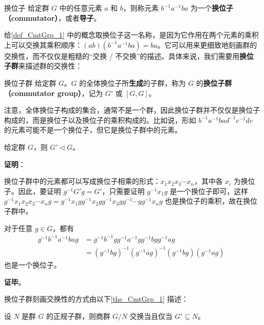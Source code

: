 


\begin{definition}{换位子}\label{def_CmtGrp_1}
给定群 $G$ 中的任意元素 $a$ 和 $b$，则称元素 $b^{-1}a^{-1}ba$ 为一个\textbf{换位子（commutator）}，或者\textbf{导子}。
\end{definition}

给\autoref{def_CmtGrp_1} 中的概念取换位子这一名称，是因为它作用在两个元素的乘积上可以交换其乘积顺序：$(ab)(b^{-1}a^{-1}ba)=ba$。它可以用来更细致地刻画群的交换性，而不仅仅是粗糙的“交换 / 不交换”的描述。具体来说，我们需要用\textbf{换位子群}来描述群的交换性：

\begin{definition}{换位子群}
给定群 $G$。$G$ 的全体换位子所\textbf{生成}的子群，称为 $G$ 的\textbf{换位子群（commutator group）}，记为 $G'$ 或 $[G, G]$。
\end{definition}

注意，全体换位子构成的集合，通常不是一个群，因此换位子群并不仅仅是换位子构成的，而是换位子以及换位子的乘积构成的。比如说，形如 $b^{-1}a^{-1}bad^{-1}c^{-1}dc$ 的元素可能不是一个换位子，但它是换位子群中的元素。

\begin{theorem}{}
给定群 $G$，则 $G'\triangleleft G$。
\end{theorem}

\textbf{证明}：

换位子群中的元素都可以写成换位子相乘的形式：$x_1x_2x_3\cdots x_n$，其中各 $x_i$ 为换位子。因此，要证明 $g^{-1}G'g=G'$，只需要证明 $g^{-1}x_1g$ 是一个换位子即可，这样 $g^{-1}x_1x_2x_3\cdots x_ng=g^{-1}x_1gg^{-1}x_2gg^{-1}x_3gg^{-1}\cdots gg^{-1}x_ng$ 也是换位子的乘积，故在换位子群中。

对于任意 $g\in G$，都有
\begin{equation}
\begin{aligned}
g^{-1}b^{-1}a^{-1}bag&=g^{-1}b^{-1}gg^{-1}a^{-1}gg^{-1}bgg^{-1}ag\\
&=(g^{-1}bg)^{-1}(g^{-1}ag)^{-1}(g^{-1}bg)(g^{-1}ag)
\end{aligned}
~
\end{equation}
也是一个换位子。

\textbf{证毕}。

换位子群刻画交换性的方式由以下\autoref{the_CmtGrp_1} 描述：

\begin{theorem}{}\label{the_CmtGrp_1}
设 $N$ 是群 $G$ 的正规子群，则商群 $G/N$ 交换当且仅当 $G'\subseteq N$。
\end{theorem}

